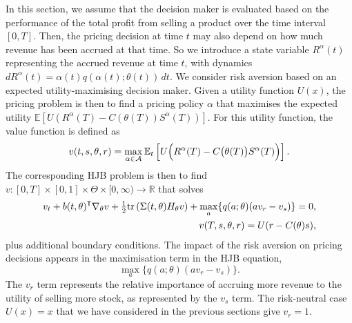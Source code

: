 \documentclass[main.tex]{subfiles}
\begin{document}
In this section, we assume that the decision maker is evaluated based on
the performance of the total profit from selling a product over the
time interval $[0,T]$. Then, the pricing decision at time $t$ may also depend
on how much revenue has been accrued at that time. So we
introduce a state variable $R^\alpha(t)$ representing the accrued
revenue at time $t$, with dynamics
$dR^\alpha(t)=\alpha(t)q(\alpha(t);\theta(t))\,dt$.
We consider risk aversion based on
an expected utility-maximising decision maker.
Given a utility function $U(x)$, the pricing problem is then to
find a pricing policy $\alpha$ that maximises the expected utility
$\mathbb{E}[U(R^\alpha(T)-C(\theta(T))S^\alpha(T))]$.
For this utility function, the value function is defined as
\begin{equation}
  v(t,s,\theta,r)=
  \max_{\alpha\in\mathcal{A}}
  \mathbb{E}_t\left[
    U\Bigl(R^\alpha(T)-C\bigl(\theta(T)\bigr)S^\alpha(T)\Bigr)
  \right].
\end{equation}
The corresponding HJB problem is then to find
$v:{[0,T]}\times{[0,1]}\times \Theta\times{[0,\infty)}\to\mathbb{R}$ that solves
\begin{align}\label{eq:hjb_utility}
  v_t+{b(t,\theta)}^\intercal \nabla_\theta v
  + {\textstyle\frac{1}{2}}\mbox{tr}\left( \Sigma(t,\theta)
  H_\theta v \right)
  +\max_{a}\{q(a;\theta)(av_r-v_s)\}=0&,\\
  v(T,s,\theta,r) = U(r-C(\theta)s)&,
\end{align}
plus additional boundary conditions. The impact of the risk aversion
on pricing decisions appears in the maximisation term in the HJB
equation,
\begin{equation}
  \max_a\{q(a;\theta)(av_r-v_s)\}.
\end{equation}
 The $v_r$ term represents
the relative importance of accruing more revenue to the utility of
selling more stock, as represented by the $v_s$ term.
The risk-neutral case $U(x)=x$ that we have considered in the previous
sections give $v_r=1$.
\end{document}
